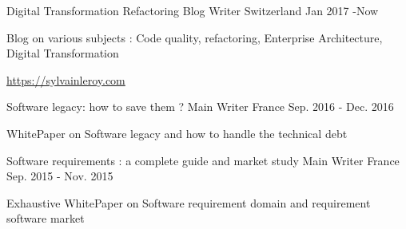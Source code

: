 

\begin{cventries}
	
	\cventry
	{Digital Transformation Refactoring} %
	{Blog Writer} %
	{Switzerland} %
	{Jan 2017 -Now} %
	{
		\begin{cvitems} %
			\item {Blog on various subjects : Code quality, refactoring, Enterprise Architecture, Digital Transformation}
			\item { \url{https://sylvainleroy.com}}
		\end{cvitems}
	}
	
	\cventry
	{Software legacy: how to save them ?} %
	{Main Writer} %
	{France} %
	{Sep. 2016 - Dec. 2016} %
	{
		\begin{cvitems} %
			\item {WhitePaper on Software legacy and how to handle the technical debt}
		\end{cvitems}
	}
	
	\cventry
	{Software requirements : a complete guide and market study} %
	{Main Writer} %
	{France} %
	{Sep. 2015 - Nov. 2015} %
	{
		\begin{cvitems} %
			\item {Exhaustive WhitePaper on Software requirement domain and requirement software market}
		\end{cvitems}
	}
	
\end{cventries}
